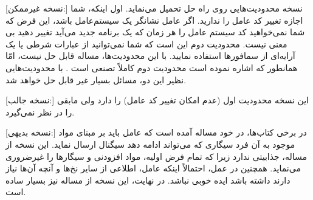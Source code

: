 \documentclass{book}
\begin{document}
\begin{description}

\item
    [نسخه غیرممکن:] نسخه  محدودیت‌هایی روی راه حل تحمیل می‌نماید. اول اینکه، شما اجازه تغییر کد عامل را ندارید. 
    اگر عامل نشانگر یک سیستم‌عامل باشد، این فرض که شما نمی‌خواهید کد سیستم عامل را هر زمان که یک برنامه جدید می‌آید تغییر دهید بی معنی نیست. 
    محدودیت دوم این است که شما نمی‌توانید از عبارات شرطی یا یک آرایه‌ای از سمافورها استفاده نمایید. با این محدودیت‌ها، 
    مساله قابل حل نیست، امّا همانطور که   اشاره نموده است محدودیت دوم کاملاً تصنعی است  \cite{Parnas}. 
    با محدودیت‌هایی نظیر این دو، مسائل بسیار غیر قابل حل خواهد شد. 

\item
    [نسخه جالب:] این نسخه محدودیت اول (عدم امکان تغییر کد عامل) را دارد ولی مابقی را در نظر نمی‌گیرد.
    
\item
    [نسخه بدیهی:] در برخی کتاب‌ها، در خود مساله آمده است که عامل باید بر مبنای مواد موجود به آن فرد سیگاری که می‌تواند ادامه دهد سیگنال ارسال نماید. 
    این نسخه از مساله، جذابیتی ندارد زیرا که تمام فرض اولیه، مواد افزودنی و سیگارها را غیرضروری می‌نماید. همچنین در عمل، احتمالاً     
     اینکه عامل، اطلاعی از سایر نخ‌ها و آنچه آن‌ها نیاز دارند داشته باشد ایده خوبی نباشد. در نهایت،  این نسخه از مساله نیز بسیار ساده است.
     
\end{description}
\end{document}
